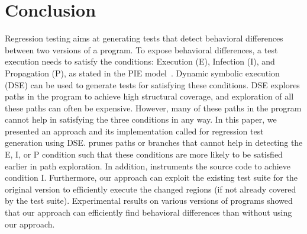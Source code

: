 
\section{Conclusion}
\label{sec:conclusion}
Regression testing aims at generating tests that detect behavioral differences between two versions of a program. To expose behavioral differences, a test execution needs to satisfy the conditions: Execution (E), Infection (I), and Propagation (P), as stated in the PIE model~\cite{voas}. Dynamic symbolic execution (DSE) can be used to generate tests for satisfying these conditions. DSE explores paths in the program to achieve high structural coverage, and exploration of all these paths can often be expensive. However, many of these paths in the program cannot help in satisfying the three conditions in any way. In this paper, we presented an approach and its implementation called  for regression test generation using DSE.  prunes paths or branches that cannot help in detecting the E, I, or P condition such that these conditions are more likely to be satisfied earlier in path exploration. In addition,  instruments the source code to
achieve condition I.
Furthermore, our approach can exploit the existing test suite for the original version to efficiently execute the changed regions (if not already covered by the test suite). 
Experimental results on various versions of programs showed that our approach can efficiently find behavioral differences than without using our approach.
